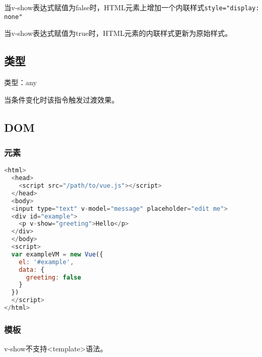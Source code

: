 \begin{compactitem}
\item 当v-show表达式赋值为false时，HTML元素上增加一个内联样式\texttt{style="display: none"}
\item 当v-show表达式赋值为true时，HTML元素的内联样式更新为原始样式。
\end{compactitem}

\subsection{类型}

\begin{compactitem}
\item 类型：any
\end{compactitem}

当条件变化时该指令触发过渡效果。

\subsection{DOM}

\subsubsection{元素}


\begin{lstlisting}[language=JavaScript]
<html>
  <head>
    <script src="/path/to/vue.js"></script>
  </head>
  <body>
  <input type="text" v-model="message" placeholder="edit me">
  <div id="example">
    <p v-show="greeting">Hello</p>
  </div>
  </body>
  <script>
  var exampleVM = new Vue({
    el: '#example',
    data: {
      greeting: false
    }
  })
  </script>
</html>
\end{lstlisting}

\subsubsection{模板}

v-show不支持<template>语法。


\begin{lstlisting}[language=JavaScript]

\end{lstlisting}



\begin{lstlisting}[language=JavaScript]

\end{lstlisting}




